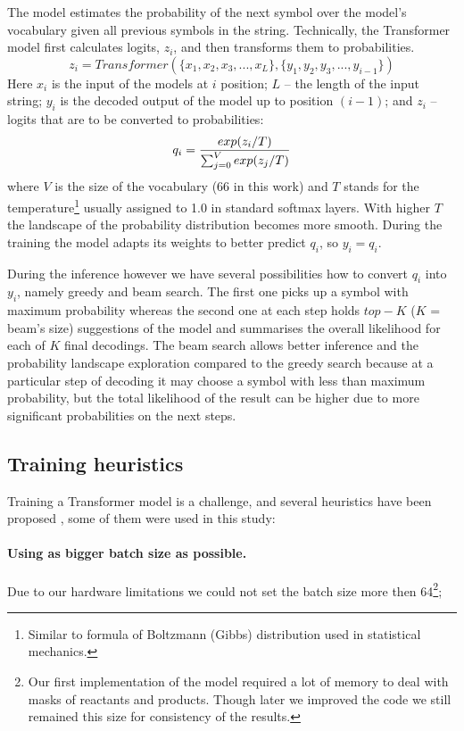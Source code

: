 \documentclass{article}
\begin{document}
The model estimates the probability of the next symbol over the model's vocabulary given all previous symbols in the string. Technically, the Transformer model first calculates logits, $z_i$, and then transforms them to probabilities. 
\begin{equation}
z_i = Transformer( \{x_1, x_2, x_3, ..., x_L\}, \{y_1, y_2, y_3, ..., y_{i-1} \})
\end{equation}
Here $x_i$ is the input of the models at $i$ position; $L$ -- the length of the input string; $y_i$ is the decoded output of the model up to position $(i-1)$; and $z_i$ -- logits that are to be converted to probabilities:
\begin{equation}
\label{eq:tempdep}
q_i = {{exp(z_i /T) }\over {\sum_{j=0}^{V} exp(z_j /T) }}
\end{equation}
where $V$ is the size of the vocabulary (66 in this work) and $T$ stands for the temperature\footnote{Similar to formula of Boltzmann (Gibbs) distribution used in statistical mechanics.} usually assigned to 1.0 in standard softmax layers. With higher $T$ the landscape of the probability distribution becomes more smooth. During the training the model adapts its weights to better predict $q_i$, so $y_i = q_i$. 

During the inference however we have several possibilities how to convert $q_i$ into $y_i$, namely greedy and beam search. The first one picks up a symbol with maximum probability whereas the second one at each step holds $top-K$ ($K$ = beam's size) suggestions of the model and summarises the overall likelihood for each of $K$ final decodings. The beam search allows better inference and the probability landscape exploration compared to the greedy search because at a particular step of decoding it may choose a symbol with less than maximum probability, but the total likelihood of the result can be higher due to more significant probabilities on the next steps.

\subsection{Training heuristics}
Training a Transformer model is a challenge, and several heuristics have been proposed \cite{TransformerTips}, some of them were used in this study:

\paragraph{Using as bigger batch size as possible.} Due to our hardware limitations we could not set the batch size more then 64\footnote{Our first implementation of the model required a lot of memory to deal with masks of reactants and products. Though later we improved the code we still remained this size for consistency of the results.};
\end{document}
